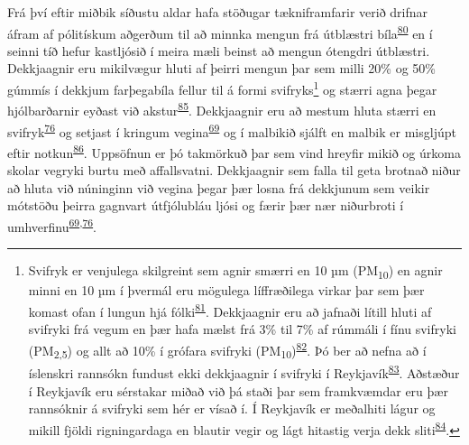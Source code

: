 \documentclass[icelandic,]{book}
\let\rmarkdownfootnote\footnote%
\def\footnote{\protect\rmarkdownfootnote}
\begin{document}
Frá því eftir miðbik síðustu aldar hafa stöðugar tækniframfarir verið drifnar áfram af pólitískum aðgerðum til að minnka mengun frá útblæstri bíla\textsuperscript{\protect\hyperlink{ref-lee2007innovation}{80}} en í seinni tíð hefur kastljósið í meira mæli beinst að mengun ótengdri útblæstri. Dekkjaagnir eru mikilvægur hluti af þeirri mengun þar sem milli 20\% og 50\% gúmmís í dekkjum farþegabíla fellur til á formi svifryks\footnote{Svifryk er venjulega skilgreint sem agnir smærri en 10 µm (PM\textsubscript{10}) en agnir minni en 10 µm í þvermál eru mögulega líffræðilega virkar þar sem þær komast ofan í lungun hjá fólki\textsuperscript{\protect\hyperlink{ref-heyder1986deposition}{81}}. Dekkjaagnir eru að jafnaði lítill hluti af svifryki frá vegum en þær hafa mælst frá 3\% til 7\% af rúmmáli í fínu svifryki (PM\textsubscript{2,5}) og allt að 10\% í grófara svifryki (PM\textsubscript{10})\textsuperscript{\protect\hyperlink{ref-grigoratos2014non}{82}}. Þó ber að nefna að í íslenskri rannsókn fundust ekki dekkjaagnir í svifryki í Reykjavík\textsuperscript{\protect\hyperlink{ref-Efla2015}{83}}. Aðstæður í Reykjavík eru sérstakar miðað við þá staði þar sem framkvæmdar eru þær rannsóknir á svifryki sem hér er vísað í. Í Reykjavík er meðalhiti lágur og mikill fjöldi rigningardaga en blautir vegir og lágt hitastig verja dekk sliti\textsuperscript{\protect\hyperlink{ref-le1998evaluation}{84}}.} og stærri agna þegar hjólbarðarnir eyðast við akstur\textsuperscript{\protect\hyperlink{ref-atech2001national}{85}}. Dekkjaagnir eru að mestum hluta stærri en svifryk\textsuperscript{\protect\hyperlink{ref-kreider2010physical}{76}} og setjast í kringum vegina\textsuperscript{\protect\hyperlink{ref-Cadle1978}{69}} og í malbikið sjálft en malbik er misgljúpt eftir notkun\textsuperscript{\protect\hyperlink{ref-Verschoor2016}{86}}. Uppsöfnun er þó takmörkuð þar sem vind hreyfir mikið og úrkoma skolar vegryki burtu með affallsvatni. Dekkjaagnir sem falla til geta brotnað niður að hluta við núninginn við vegina þegar þær losna frá dekkjunum sem veikir mótstöðu þeirra gagnvart útfjólubláu ljósi og færir þær nær niðurbroti í umhverfinu\textsuperscript{\protect\hyperlink{ref-Cadle1978}{69},\protect\hyperlink{ref-kreider2010physical}{76}}.
\end{document}
